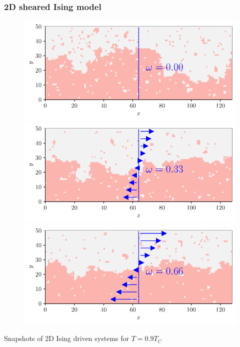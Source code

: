 \documentclass[9pt, dvipsnames,aspectratio=169]{beamer} %
\begin{document}
\begin{frame}
    \frametitle{2D sheared Ising model}
    	\begin{figure}
		\begin{minipage}[t]{0.48\linewidth}
		\includegraphics[width=\linewidth]{cis-ising-f-000.pdf}
		\end{minipage}%
		\begin{minipage}[t]{0.48\linewidth}
		\includegraphics[width=\linewidth]{cis-ising-f-033.pdf}
		\end{minipage}
		\begin{minipage}[c]{0.48\linewidth}
		\includegraphics[width=\linewidth]{cis-ising-f-066.pdf} 
		\end{minipage}
    \end{figure}  
    \centering
	\small Snapshots of 2D Ising driven systems for $T=0.9 T_C$
\end{frame}
\end{document}
